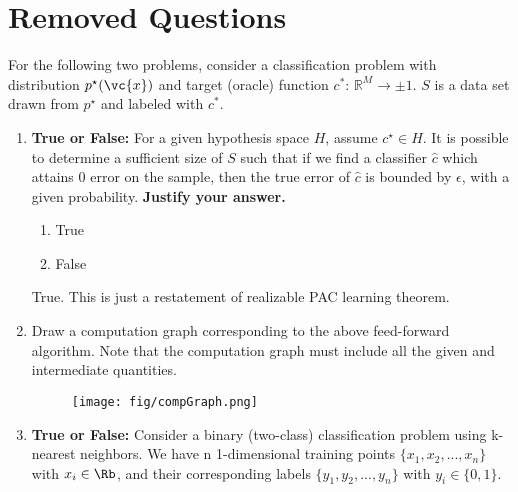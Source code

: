 \section{Removed Questions}

\vspace{1em}
For the following two problems, consider a classification problem with distribution $p^\star(\vc{x})$ and target (oracle) function $c^*$: $\mathbb{R}^M \rightarrow \pm 1$. 
$S$ is a data set drawn from $p^\star$ and labeled with $c^*$.

\begin{enumerate}

\item {} \textbf{True or False:} 
For a given hypothesis space $H$, assume $c^\star \in H$. 
    It is possible to determine a sufficient size of $S$ such that if we find a classifier $\hat{c}$ which attains $0$ error on the sample, then the true error of $\hat{c}$ is bounded by  $\epsilon$, with a given probability.     \textbf{Justify your answer.}
    \begin{enumerate}
    \item True
    \item False
    \end{enumerate}
    \fillwithlines{4em} 
\begin{soln} True. This is just a restatement of realizable PAC learning theorem.
\end{soln}
    
    
\item{} Draw a computation graph corresponding to the above feed-forward algorithm. Note that the computation graph must include all the given and intermediate quantities.

\vspace{12em}

\begin{soln}

\begin{figure}[H]
\begin{center}
    \texttt{[image: fig/compGraph.png]}
\end{center}
\end{figure}
\end{soln}

\item \textbf{True or False:} Consider a binary (two-class) classification problem using k-nearest neighbors. We have n 1-dimensional training points $\{x_1,x_2,...,x_n\}$ with $x_i \in \Rb$, and their corresponding labels $\{y_1, y_2, ..., y_n\}$ with $y_i \in \{0,1\}$. 


\end{enumerate}
